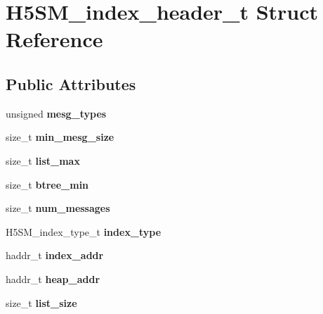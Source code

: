 \hypertarget{struct_h5_s_m__index__header__t}{}\section{H5\+S\+M\+\_\+index\+\_\+header\+\_\+t Struct Reference}
\label{struct_h5_s_m__index__header__t}
\subsection*{Public Attributes}
\begin{DoxyCompactItemize}
\item 
\mbox{\label{struct_h5_s_m__index__header__t_a2c84499c749fc6ca320d390e85237eec}} 
unsigned {\bfseries mesg\+\_\+types}
\item 
\mbox{\label{struct_h5_s_m__index__header__t_a0d0e65fe2f81e2134b4ceaeaf8a7209f}} 
size\+\_\+t {\bfseries min\+\_\+mesg\+\_\+size}
\item 
\mbox{\label{struct_h5_s_m__index__header__t_a08985acac9cc1047b9d1dd2cd231b0ac}} 
size\+\_\+t {\bfseries list\+\_\+max}
\item 
\mbox{\label{struct_h5_s_m__index__header__t_a2fa156d1dd468e9397ae0e30e7eca027}} 
size\+\_\+t {\bfseries btree\+\_\+min}
\item 
\mbox{\label{struct_h5_s_m__index__header__t_a4d33d251331bfa6352b6030d2f8fa7c2}} 
size\+\_\+t {\bfseries num\+\_\+messages}
\item 
\mbox{\label{struct_h5_s_m__index__header__t_abb44c744595a4a3ab192ab36cf95555a}} 
H5\+S\+M\+\_\+index\+\_\+type\+\_\+t {\bfseries index\+\_\+type}
\item 
\mbox{\label{struct_h5_s_m__index__header__t_ae3b41b62a5179cde976a92365c82463e}} 
haddr\+\_\+t {\bfseries index\+\_\+addr}
\item 
\mbox{\label{struct_h5_s_m__index__header__t_aa4e2fa82550d1e09138a48e01c6cb332}} 
haddr\+\_\+t {\bfseries heap\+\_\+addr}
\item 
\mbox{\label{struct_h5_s_m__index__header__t_ae7151443b45788ddf21501d8fee0082f}} 
size\+\_\+t {\bfseries list\+\_\+size}
\end{DoxyCompactItemize}


